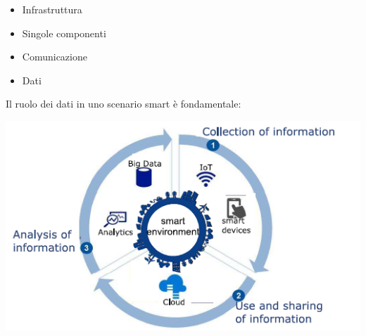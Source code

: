 \begin{itemize}
    \item Infrastruttura
    \item Singole componenti
    \item Comunicazione
    \item Dati
\end{itemize}
Il ruolo dei dati in uno scenario smart è fondamentale:
\begin{center}
    \includegraphics[scale=0.5]{img/smartenv.png}
\end{center}

